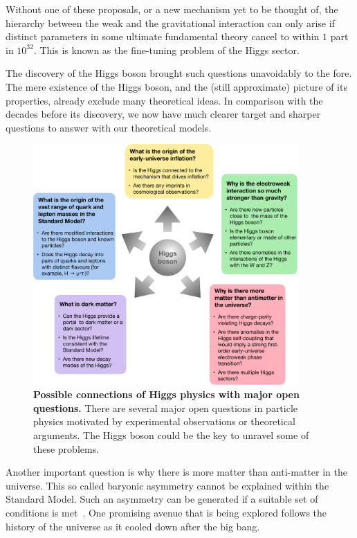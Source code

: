 \documentclass{article}
\begin{document}
Without one of these proposals, or a new mechanism yet to be thought of, 
the hierarchy between the weak and the gravitational interaction can only arise if distinct parameters in some
ultimate fundamental theory cancel to within $1$ part in $10^{32}$. 
%
This is known as the fine-tuning problem of the Higgs sector.

The discovery of the Higgs boson brought such questions unavoidably to
the fore. The mere existence of the Higgs boson, and the (still approximate) picture of its properties, already exclude many theoretical ideas. In comparison with the decades before its discovery, we now have much clearer target and sharper questions to answer with our theoretical models.
%

\begin{figure}[htb]
  \centering
  \includegraphics[width=0.9\textwidth]{figs/Fig5-crop.pdf}  
    \caption{{\bf Possible connections of Higgs physics with major open questions.}
      There are several major open questions in particle physics motivated by experimental observations or theoretical arguments. The Higgs boson could be the key to unravel some of these problems.
 }
 \label{fig:HiggsNP}
\end{figure}



Another important question is why there is more matter than
anti-matter in the universe.
%
This so called baryonic asymmetry cannot be explained within the Standard
Model.
%
Such an asymmetry can be generated if a suitable set of conditions is
met~\cite{Sakharov:1967dj}.
%
One promising avenue that is being explored follows the history of the
universe as it cooled down after the big bang.
\end{document}
